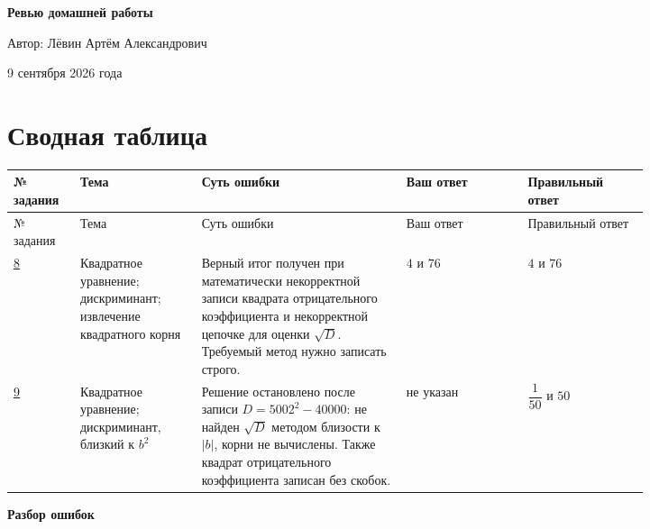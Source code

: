 \documentclass[12pt,a4paper]{article}
\begin{document}
\begin{titlepage}
\centering
\vspace*{0.22\textheight}
{\LARGE\bfseries Ревью домашней работы\par}
\vspace{2.2cm}
{\large Автор: Лёвин Артём Александрович\par}
\vspace{0.8cm}
{\large 9 сентября 2026 года\par}
\vfill
{}
\end{titlepage}

\newpage
\section*{Сводная таблица}
\small
\begin{longtable}{@{}>{\centering\arraybackslash}p{0.07\linewidth}p{0.16\linewidth}p{0.27\linewidth}p{0.16\linewidth}p{0.16\linewidth}@{}}
\toprule
№ задания & Тема & Суть ошибки & Ваш ответ & Правильный ответ \\
\midrule
\endfirsthead
\toprule
№ задания & Тема & Суть ошибки & Ваш ответ & Правильный ответ \\
\midrule
\endhead
\hyperref[task:8]{8} & Квадратное уравнение; дискриминант; извлечение квадратного корня & Верный итог получен при математически некорректной записи квадрата отрицательного коэффициента и некорректной цепочке для оценки $\sqrt{D}$. Требуемый метод нужно записать строго. & $4$ и $76$ & $4$ и $76$ \\
\addlinespace
\hyperref[task:9]{9} & Квадратное уравнение; дискриминант, близкий к $b^2$ & Решение остановлено после записи $D=5002^2-40000$: не найден $\sqrt D$ методом близости к $|b|$, корни не вычислены. Также квадрат отрицательного коэффициента записан без скобок. & не указан & $\dfrac1{50}$ и $50$ \\
\bottomrule
\end{longtable}
\normalsize

\newpage
\thispagestyle{empty}
\vspace*{\fill}
\begin{center}
{\LARGE\bfseries Разбор ошибок}
\end{center}
\vspace*{\fill}
\end{document}
